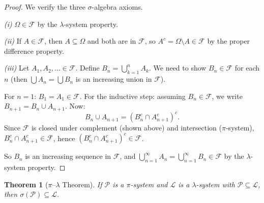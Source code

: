 \documentclass[11pt,a4paper]{article}
\theoremstyle{definition}
\theoremstyle{plain}
\newtheorem{theorem}{Theorem}[section]
\theoremstyle{remark}
\begin{document}
\begin{proof}
We verify the three $\sigma$-algebra axioms.

\textit{(i)} $\Omega \in \mathcal{F}$ by the $\lambda$-system property.

\textit{(ii)} If $A \in \mathcal{F}$, then $A \subseteq \Omega$ and both are in $\mathcal{F}$, so $A^c = \Omega \setminus A \in \mathcal{F}$ by the proper difference property.

\textit{(iii)} Let $A_1, A_2, \ldots \in \mathcal{F}$. Define $B_n = \bigcup_{k=1}^n A_k$.
We need to show $B_n \in \mathcal{F}$ for each $n$ (then $\bigcup A_n = \bigcup B_n$
is an increasing union in $\mathcal{F}$).

For $n = 1$: $B_1 = A_1 \in \mathcal{F}$. For the inductive step: assuming $B_n \in \mathcal{F}$,
we write $B_{n+1} = B_n \cup A_{n+1}$. Now:
\begin{equation}
    B_n \cup A_{n+1} = (B_n^c \cap A_{n+1}^c)^c.
\end{equation}
Since $\mathcal{F}$ is closed under complement (shown above) and intersection
($\pi$-system), $B_n^c \cap A_{n+1}^c \in \mathcal{F}$, hence
$(B_n^c \cap A_{n+1}^c)^c \in \mathcal{F}$.

So $B_n$ is an increasing sequence in $\mathcal{F}$, and $\bigcup_{n=1}^\infty A_n = \bigcup_{n=1}^\infty B_n \in \mathcal{F}$ by the $\lambda$-system property.
\end{proof}

\begin{keyresult}
\begin{theorem}[$\pi$--$\lambda$ Theorem]
\label{thm:pi_lambda}
If $\mathcal{P}$ is a $\pi$-system and $\mathcal{L}$ is a $\lambda$-system with
$\mathcal{P} \subseteq \mathcal{L}$, then $\sigma(\mathcal{P}) \subseteq \mathcal{L}$.
\end{theorem}
\end{keyresult}
\end{document}
